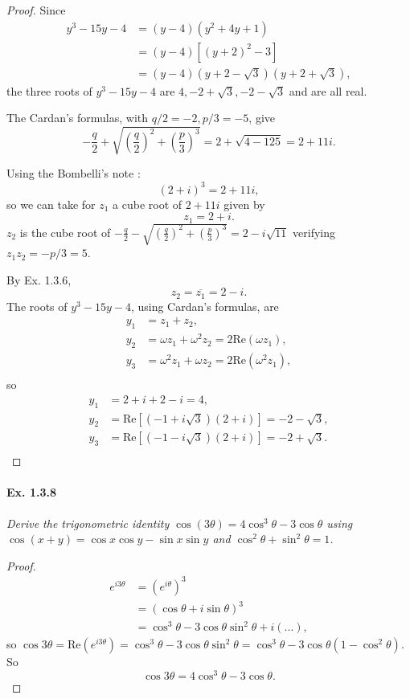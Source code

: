 \documentclass[11pt,a4paper]{article}
\begin{document}
\begin{proof} Since
\begin{align*}
y^3-15y-4 &= (y-4)(y^2+4y+1)\\
&=(y-4)[(y+2)^2-3]\\
&=(y-4)(y+2-\sqrt{3})(y+2+\sqrt{3}),
\end{align*}
the three roots of $y^3-15y-4$ are $4,-2+\sqrt{3},-2-\sqrt{3}$ and are all real.

The Cardan's formulas, with $q/2 = -2,p/3=-5 $, give 
$$-\frac{q}{2}+ \sqrt{\left (\frac{q}{2}\right)^2+\left (\frac{p}{3}\right)^3} = 2 + \sqrt{4 - 125} = 2 + 11i.$$


Using the Bombelli's note :
$$(2+i)^3 = 2+11i,$$
so we can take for $z_1$ a cube root of $2+11i$ given by 
$$z_1 = 2+i.$$
$z_2$ is the cube root of $-\frac{q}{2}- \sqrt{\left (\frac{q}{2}\right)^2+\left (\frac{p}{3}\right)^3}= 2 - i \sqrt{11}$ verifying $z_1 z_2 = -p/3 = 5$. 

By Ex. 1.3.6,  $$z_2 = \overline{z_1} = 2 -i.$$
The roots of $y^3-15y-4$, using Cardan's formulas, are
\begin{align*}
y_1 &= z_1+ z_2,\\
y_2 &= \omega z_1 + \omega^2 z_2 = 2\mathrm{Re}(\omega z_1),\\
y_3 &= \omega^2 z_1 + \omega z_2 = 2\mathrm{Re}(\omega^2 z_1),\\
\end{align*}
so
\begin{align*}
y_1 &= 2+i + 2 -i = 4,\\
y_2 &=\mathrm{Re}[(-1+i\sqrt{3})(2+i)] = -2 - \sqrt{3},\\
y_3 &= \mathrm{Re}[(-1-i\sqrt{3})(2+i)] = -2 + \sqrt{3}.\\
\end{align*}
\end{proof}

\paragraph{Ex. 1.3.8}

{\it Derive the trigonometric identity $\cos(3\theta) = 4 \cos^3 \theta - 3 \cos \theta$ using ${\cos(x+y)} = \cos x \cos y - \sin x \sin y$ and $\cos^2 \theta + \sin^2 \theta = 1$.
}

\begin{proof}
\begin{align*}
e^{i3\theta} &= \left(e^{i\theta}\right)^3\\
&=(\cos \theta + i \sin \theta)^3\\
&= \cos^3 \theta - 3\cos \theta \sin^2 \theta + i (...),
\end{align*}
so $\cos 3 \theta = \mathrm{Re}(e^{i3\theta}) = \cos^3 \theta - 3\cos \theta \sin^2 \theta = \cos^3 \theta - 3\cos\theta (1-\cos^2 \theta) $.
So
$$\cos 3 \theta = 4 \cos^3 \theta - 3 \cos \theta.$$
\end{proof}
\end{document}

